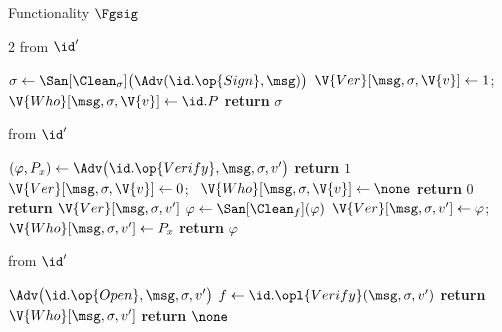 \begin{interface}[nofloat]{Functionality $\Fgsig$ \\
}
{\begin{multicols}{2}
 \quad from $\id'$
\begin{algorithmic}[1]
\algcont
{} \label{ln:gsmember}
\State $\sigma \gets \San[\Clean_{\sigma}]\bigl(\Adv(\id.\op{Sign}, \msg)\bigr)$ \label{ln:gssignleak}
 \label{ln:gsnoreuse}
\State $\V{Ver}[\msg, \sigma, \V{v}] \gets 1$; \ $\V{Who}[\msg, \sigma, \V{v}] \gets \id.P$
\State \textbf{return} $\sigma$
\algsave
\end{algorithmic}
\vspace{1.4ex}

\columnbreak

 \quad from $\id'$
\begin{algorithmic}[1]
\algcont
\State $(\varphi, P_{x}) \gets \Adv\bigl(\id.\op{Verify}, \msg, \sigma, v'\bigr)$ \label{ln:gsverask}
  \State \textbf{return} $1$ \label{ln:gscompleteness}
\EndIf
{}
  \State $\V{Ver}[\msg, \sigma, \V{v}] \gets 0$; \ $\V{Who}[\msg, \sigma, \V{v}] \gets \none$ \label{ln:gsunforge}
  \State \textbf{return} $0$
\EndIf
{}
  \State \textbf{return} $\V{Ver}[\msg, \sigma, v']$ \label{ln:gsconsistent}
\EndIf
\State $\varphi \gets \San[\Clean_{f}](\varphi)$
\State $\V{Ver}[\msg, \sigma, v'] \gets \varphi$; \ $\V{Who}[\msg, \sigma, v'] \gets P_{x}$ \label{ln:gsadvverdict}
\State \textbf{return} $\varphi$
\algsave
\end{algorithmic}
\vspace{1.4ex}

 \quad from $\id'$
\begin{algorithmic}[1]
\algcont
{} \label{ln:gsopengm}
\State $\Adv\bigl(\id.\op{Open}, \msg, \sigma, v'\bigr)$
\State $f \gets \id.\opl{Verify}(\msg, \sigma, v')$ \label{ln:gsopenverify}
  \State \textbf{return} $\V{Who}[\msg, \sigma, v']$ \label{ln:gstrace}
\EndIf
\State \textbf{return} $\none$
\algsave
\end{algorithmic}
\vspace{1.4ex}


\end{multicols}}
\end{interface}
